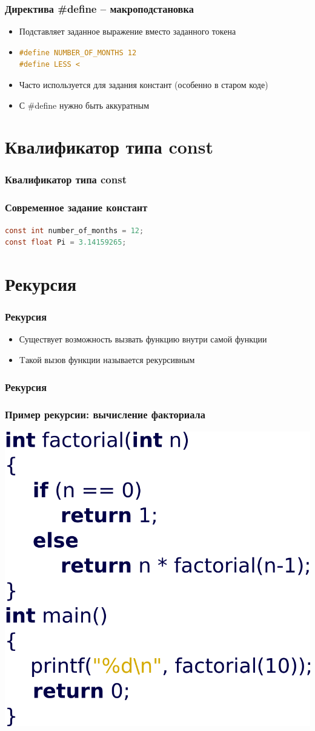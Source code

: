 \documentclass[12pt,pdf,hyperref={unicode}]{beamer}
\begin{document}
\begin{frame}[fragile]
\frametitle{Директива \#define -- макроподстановка} 
\begin{itemize}
\item Подставляет заданное выражение вместо заданного токена
\item \begin{lstlisting}[language=C,basicstyle=\ttfamily,keywordstyle=\color{blue}]
#define NUMBER_OF_MONTHS 12
#define LESS <
\end{lstlisting}
\item Часто используется для задания констант (особенно в старом коде)
\item С \#define нужно быть аккуратным
\end{itemize}
\end{frame}


\section{Квалификатор типа const}

\begin{frame}[fragile]
\frametitle{Квалификатор типа const} 
\frametitle{Современное задание констант}
\begin{lstlisting}[language=C,basicstyle=\ttfamily,keywordstyle=\color{blue}]
const int number_of_months = 12;
const float Pi = 3.14159265;
\end{lstlisting}
\end{frame}

\fi

\section{Рекурсия}


\begin{frame}[fragile]
\frametitle{Рекурсия} 
\begin{itemize}
\item Существует возможность вызвать функцию внутри самой функции
\item Tакой вызов функции называется рекурсивным
\end{itemize}
\end{frame}

\begin{frame}[fragile]
\frametitle{Рекурсия} 
\frametitle{Пример рекурсии: вычисление факториала} 
\begin{center}
\includegraphics[width=0.65\linewidth]{images/function_recursive.png}
\end{center}
\end{frame}
\end{document}
